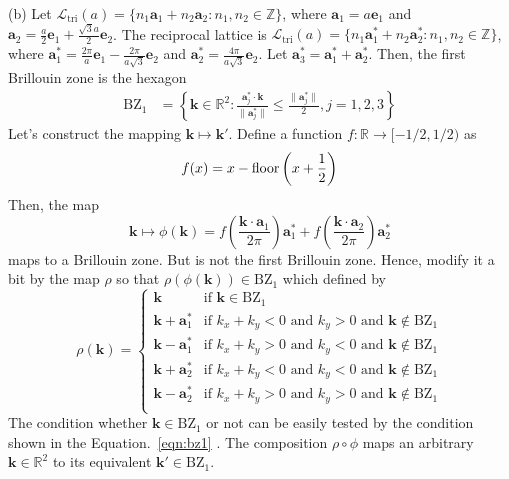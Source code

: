 \documentclass[a4paper,11pt]{article}
\begin{document}
(b) Let $\mathcal L_{\text{tri}}(a)=\{n_1\mathbf a_1+n_2\mathbf a_2:n_1, n_2\in\mathbb Z\}$, where $\mathbf a_1=a\mathbf e_1$ and $\mathbf a_2=\frac{a}{2}\mathbf e_1+\frac{\sqrt{3}a}{2}\mathbf e_2$. The reciprocal lattice is $\mathcal L_{\text{tri}}(a)=\{n_1\mathbf a_1^*+n_2\mathbf a_2^*:n_1, n_2\in\mathbb Z\}$, where $\mathbf a_1^*=\frac{2\pi}{a}\mathbf e_1-\frac{2\pi}{a\sqrt{3}}\mathbf e_2$ and $\mathbf a^*_2=\frac{4\pi}{a\sqrt{3}}\mathbf e_2$. Let $\mathbf a_3^*=\mathbf a_1^*+\mathbf a_2^*$. Then, the first Brillouin zone is the hexagon
\begin{align}
    \mathrm{BZ}_1
    &=\left\{\mathbf k\in\mathbb R^2:\frac{\mathbf a_{j}^*\cdot \mathbf k}{\|\mathbf a_j^*\|}\le\frac{\|\mathbf a_j^*\|}{2}, j=1,2,3\right\}\label{eqn:bz1}
\end{align}
Let's construct the mapping  $\mathbf k\mapsto \mathbf k'$. Define a function $f:\mathbb R\rightarrow [-1/2, 1/2)$ as
\begin{equation}
    f(x)=x-\operatorname{floor}\left(x+\frac{1}{2}\right)
\end{equation}
Then, the map 
\begin{equation}
    \mathbf k\mapsto \phi(\mathbf k)=f\left(\frac{\mathbf k\cdot\mathbf a_1}{2\pi}\right)\mathbf a_1^*+ f\left(\frac{\mathbf k\cdot\mathbf a_2}{2\pi}\right)\mathbf a_2^*
\end{equation}
maps to a Brillouin zone. But is not the first Brillouin zone. Hence, modify it a bit by the map $\rho$ so that $\rho(\phi(\mathbf k))\in\mathrm{BZ}_1$ which defined by
\begin{equation}
    \rho(\mathbf k)=\begin{cases}
        \mathbf k & \text{if $\mathbf k\in\mathrm{BZ}_1$}\\
        \mathbf k+\mathbf a_1^* &\text{if $k_x+k_y<0$ and $k_y>0$ and  $\mathbf k\notin\mathrm{BZ}_1$} \\
        \mathbf k-\mathbf a_1^* &\text{if $k_x+k_y>0$ and $k_y<0$ and  $\mathbf k\notin\mathrm{BZ}_1$}  \\
        \mathbf k+\mathbf a_2^* &\text{if $k_x+k_y<0$ and $k_y<0$ and  $\mathbf k\notin\mathrm{BZ}_1$}  \\
        \mathbf k-\mathbf a_2^* &\text{if $k_x+k_y>0$ and $k_y>0$ and  $\mathbf k\notin\mathrm{BZ}_1$}  \\
    \end{cases}
\end{equation}
The condition whether $\mathbf k\in \mathrm{BZ}_1$ or not can be easily tested by the condition shown in the Equation.~\ref{eqn:bz1}
. The composition $\rho\circ\phi$ maps an arbitrary $\mathbf k\in\mathbb R^2$ to its equivalent $\mathbf k'\in\mathrm{BZ}_1$.
\end{document}

